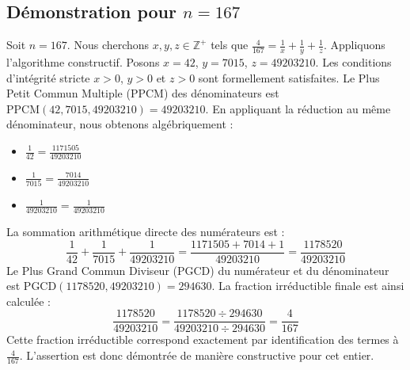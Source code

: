 \documentclass[11pt,a4paper]{article}
\begin{document}
\subsection{Démonstration pour $n = 167$}
Soit $n = 167$. Nous cherchons $x, y, z \in \mathbb{Z}^{+}$ tels que $\frac{4}{167} = \frac{1}{x} + \frac{1}{y} + \frac{1}{z}$.
Appliquons l'algorithme constructif. Posons $x = 42$, $y = 7015$, $z = 49203210$.
Les conditions d'intégrité stricte $x > 0$, $y > 0$ et $z > 0$ sont formellement satisfaites.
Le Plus Petit Commun Multiple (PPCM) des dénominateurs est $\text{PPCM}(42, 7015, 49203210) = 49203210$.
En appliquant la réduction au même dénominateur, nous obtenons algébriquement :
\begin{itemize}
    \item $\frac{1}{42} = \frac{1171505}{49203210}$
    \item $\frac{1}{7015} = \frac{7014}{49203210}$
    \item $\frac{1}{49203210} = \frac{1}{49203210}$
\end{itemize}
La sommation arithmétique directe des numérateurs est :
$$ \frac{1}{42} + \frac{1}{7015} + \frac{1}{49203210} = \frac{1171505 + 7014 + 1}{49203210} = \frac{1178520}{49203210} $$
Le Plus Grand Commun Diviseur (PGCD) du numérateur et du dénominateur est $\text{PGCD}(1178520, 49203210) = 294630$.
La fraction irréductible finale est ainsi calculée :
$$ \frac{1178520}{49203210} = \frac{1178520 \div 294630}{49203210 \div 294630} = \frac{4}{167} $$
Cette fraction irréductible correspond exactement par identification des termes à $\frac{4}{167}$. L'assertion est donc démontrée de manière constructive pour cet entier.
\end{document}
